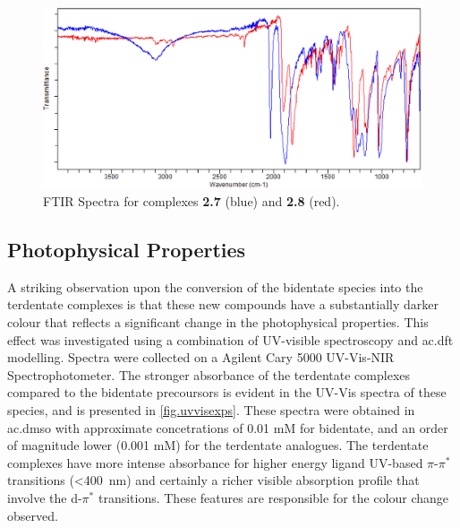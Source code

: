 \begin{figure}[!htb]
 \centering
 \includegraphics[clip=true, width=\textwidth, keepaspectratio]{images/ftir7and8.eps}
 \caption[FTIR Spectra for complexes \textbf{2.7} and \textbf{2.8}]{FTIR Spectra for complexes \textbf{2.7} (blue) and \textbf{2.8} (red).}
 \label{fig.ir78}
\end{figure}

\FloatBarrier
\subsection{Photophysical Properties}

A striking observation upon the conversion of the bidentate species into the terdentate complexes is that these new compounds have a substantially darker colour that reflects a significant change in the photophysical properties. This effect was investigated using a combination of UV-visible spectroscopy and \gls{ac.dft} modelling. Spectra were collected on a Agilent Cary 5000 UV-Vis-NIR Spectrophotometer. The stronger absorbance of the terdentate complexes compared to the bidentate precoursors is evident in the UV-Vis spectra of these species, and is presented in \autoref{fig.uvvisexps}. These spectra were obtained in \gls{ac.dmso} with approximate concetrations of 0.01 mM for bidentate, and an order of magnitude lower (0.001 mM) for the terdentate analogues. The terdentate complexes have more intense absorbance for higher energy ligand UV-based $\pi$-$\pi^\ast$ transitions (\textless 400~nm) and certainly a richer visible absorption profile that involve the d-$\pi^\ast$ transitions. These features are responsible for the colour change observed.

